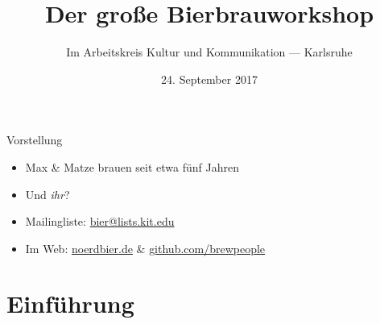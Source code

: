 \documentclass[9pt, ngerman]{beamer}
\title{Der große Bierbrauworkshop}
\author{Im Arbeitskreis Kultur und Kommunikation --- Karlsruhe}
\date{24. September 2017}
\begin{document}
\maketitle


\begin{frame}{Vorstellung}
  \begin{itemize}
    \item Max \& Matze brauen seit etwa fünf Jahren
    \item<2-> Und \emph{ihr}?
  \end{itemize}

  \begin{itemize}
    \item Mailingliste: \url{bier@lists.kit.edu}
    \item Im Web: \url{noerdbier.de} \& \url{github.com/brewpeople}
  \end{itemize}
\end{frame}

\section{Einführung}
\end{document}
